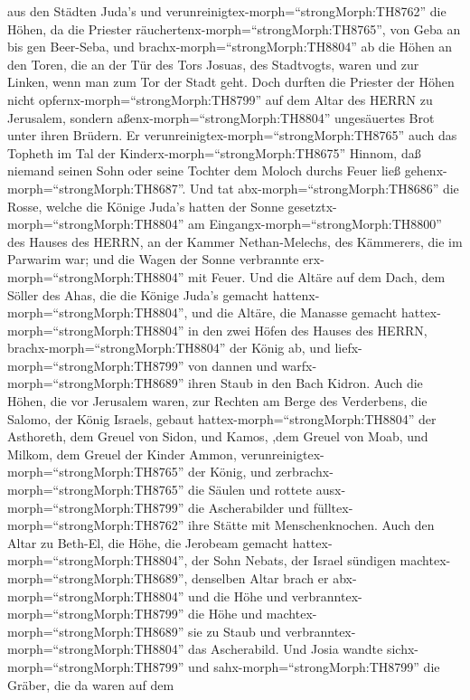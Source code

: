 aus den Städten Juda's und verunreinigtex-morph=``strongMorph:TH8762''
die Höhen, da die Priester räuchertenx-morph=``strongMorph:TH8765'', von
Geba an bis gen Beer-Seba, und brachx-morph=``strongMorph:TH8804'' ab
die Höhen an den Toren, die an der Tür des Tors Josuas, des Stadtvogts,
waren und zur Linken, wenn man zum Tor der Stadt geht.  Doch
durften die Priester der Höhen nicht
opfernx-morph=``strongMorph:TH8799'' auf dem Altar des HERRN zu
Jerusalem, sondern aßenx-morph=``strongMorph:TH8804'' ungesäuertes Brot
unter ihren Brüdern.  Er
verunreinigtex-morph=``strongMorph:TH8765'' auch das Topheth im Tal der
Kinderx-morph=``strongMorph:TH8675'' Hinnom, daß niemand seinen Sohn
oder seine Tochter dem Moloch durchs Feuer ließ
gehenx-morph=``strongMorph:TH8687''.  Und tat
abx-morph=``strongMorph:TH8686'' die Rosse, welche die Könige Juda's
hatten der Sonne gesetztx-morph=``strongMorph:TH8804'' am
Eingangx-morph=``strongMorph:TH8800'' des Hauses des HERRN, an der
Kammer Nethan-Melechs, des Kämmerers, die im Parwarim war; und die Wagen
der Sonne verbrannte erx-morph=``strongMorph:TH8804'' mit Feuer.
 Und die Altäre auf dem Dach, dem Söller des Ahas, die die
Könige Juda's gemacht hattenx-morph=``strongMorph:TH8804'', und die
Altäre, die Manasse gemacht hattex-morph=``strongMorph:TH8804'' in den
zwei Höfen des Hauses des HERRN, brachx-morph=``strongMorph:TH8804'' der
König ab, und liefx-morph=``strongMorph:TH8799'' von dannen und
warfx-morph=``strongMorph:TH8689'' ihren Staub in den Bach Kidron.
 Auch die Höhen, die vor Jerusalem waren, zur Rechten am
Berge des Verderbens, die Salomo, der König Israels, gebaut
hattex-morph=``strongMorph:TH8804'' der Asthoreth, dem Greuel von Sidon,
und Kamos, ,dem Greuel von Moab, und Milkom, dem Greuel der Kinder
Ammon, verunreinigtex-morph=``strongMorph:TH8765'' der König,
 und zerbrachx-morph=``strongMorph:TH8765'' die Säulen und
rottete ausx-morph=``strongMorph:TH8799'' die Ascherabilder und
fülltex-morph=``strongMorph:TH8762'' ihre Stätte mit Menschenknochen.
 Auch den Altar zu Beth-El, die Höhe, die Jerobeam gemacht
hattex-morph=``strongMorph:TH8804'', der Sohn Nebats, der Israel
sündigen machtex-morph=``strongMorph:TH8689'', denselben Altar brach er
abx-morph=``strongMorph:TH8804'' und die Höhe und
verbranntex-morph=``strongMorph:TH8799'' die Höhe und
machtex-morph=``strongMorph:TH8689'' sie zu Staub und
verbranntex-morph=``strongMorph:TH8804'' das Ascherabild. 
Und Josia wandte sichx-morph=``strongMorph:TH8799'' und
sahx-morph=``strongMorph:TH8799'' die Gräber, die da waren auf dem
